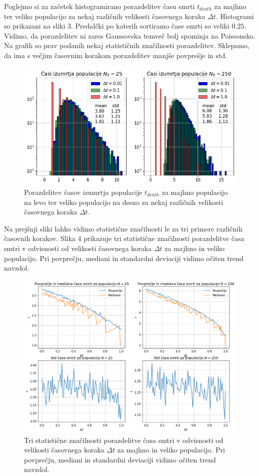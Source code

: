 \documentclass[slovene,11pt,a4paper]{article}
\begin{document}
Poglejmo si za začetek histogramirano porazdelitev času smrti $t_{death}$ za majhno ter veliko populacijo za nekaj različnih velikosti časovnega koraka $\Delta t$. Histogrami so prikazani na sliki 3. Predalčki po katerih sortiramo čase smrti so veliki $0.25$. Vidimo, da porazdelitev ni zares Gaussovska temveč bolj spominja na Poissonsko. Na grafih so prav podanih nekaj statističnih značilnosti porazdelitev. Sklepamo, da ima s večjim časovnim korakom porazdelitev manjše povprešje in std.

\begin{figure}[h!]
\centering
\includegraphics[width=12cm]{slika3.png}
\caption{Porazdelitev časov izumrtja populacije $t_{death}$ za majhno populacijo na levo ter veliko populacijo na desno za nekaj različnih velikosti časovnega koraka $\Delta t$.}
\end{figure}

\newpage

Na prejšnji sliki lahko vidimo statistične značilnosti le za tri primere različnih časovnih korakov. Slika 4 prikazuje tri statistične značilnosti porazdelitve časa smtri v odvisnosti od velikosti časovnega koraka $\Delta t$ za majhno in veliko populacijo. Pri povprečju, mediani in standardni deviaciji vidimo očiten trend navzdol.

\begin{figure}[h!]
\centering
\includegraphics[width=15cm]{slika4.png}
\caption{Tri statistične značilnosti porazdelitve časa smtri v odvisnosti od velikosti časovnega koraka $\Delta t$ za majhno in veliko populacijo. Pri povprečju, mediani in standardni deviaciji vidimo očiten trend navzdol.}
\end{figure}
\end{document}
